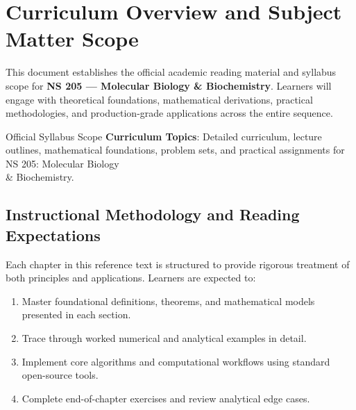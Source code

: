 \section{Curriculum Overview and Subject Matter Scope}

This document establishes the official academic reading material and syllabus scope for \textbf{NS 205 --- Molecular Biology \& Biochemistry}. Learners will engage with theoretical foundations, mathematical derivations, practical methodologies, and production-grade applications across the entire sequence.

\begin{InsightBox}{Official Syllabus Scope}
  \textbf{Curriculum Topics}: Detailed curriculum, lecture outlines, mathematical foundations, problem sets, and practical assignments for NS 205: Molecular Biology \\& Biochemistry.
\end{InsightBox}

\subsection{Instructional Methodology and Reading Expectations}

Each chapter in this reference text is structured to provide rigorous treatment of both principles and applications. Learners are expected to:
\begin{enumerate}
  \item Master foundational definitions, theorems, and mathematical models presented in each section.
  \item Trace through worked numerical and analytical examples in detail.
  \item Implement core algorithms and computational workflows using standard open-source tools.
  \item Complete end-of-chapter exercises and review analytical edge cases.
\end{enumerate}

